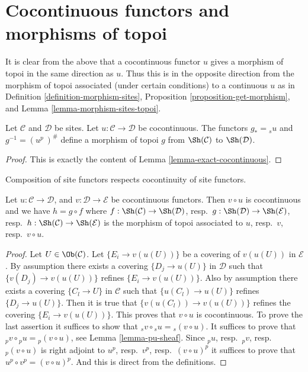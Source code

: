 \section{Cocontinuous functors and morphisms of topoi}
\label{section-cocontinuous-morphism-topoi}

\noindent
It is clear from the above that a cocontinuous functor $u$
gives a morphism of topoi in the same direction as $u$.
Thus this is in the opposite direction from the morphism of topoi
associated (under certain conditions) to a continuous $u$ as in
Definition \ref{definition-morphism-sites},
Proposition \ref{proposition-get-morphism}, and
Lemma \ref{lemma-morphism-sites-topoi}.

\begin{lemma}
\label{lemma-cocontinuous-morphism-topoi}
Let $\mathcal{C}$ and $\mathcal{D}$ be sites.
Let $u : \mathcal{C} \to \mathcal{D}$ be cocontinuous.
The functors $g_* = {}_su$ and $g^{-1} = (u^p\ )^\#$
define a morphism of topoi
$g$ from  $\Sh(\mathcal{C})$ to $\Sh(\mathcal{D})$.
\end{lemma}

\begin{proof}
This is exactly the content of Lemma \ref{lemma-exact-cocontinuous}.
\end{proof}

\begin{lemma}
\label{lemma-composition-cocontinuous}
\begin{slogan}
Composition of site functors respects cocontinuity of site functors.
\end{slogan}
Let $u : \mathcal{C} \to \mathcal{D}$, and $v : \mathcal{D} \to \mathcal{E}$
be cocontinuous functors. Then $v \circ u$ is cocontinuous and we
have $h = g \circ f$
where $f : \Sh(\mathcal{C}) \to \Sh(\mathcal{D})$,
resp.\ $g : \Sh(\mathcal{D}) \to \Sh(\mathcal{E})$,
resp.\ $h : \Sh(\mathcal{C}) \to \Sh(\mathcal{E})$ is the
morphism of topoi associated to $u$, resp.\ $v$, resp.\ $v \circ u$.
\end{lemma}

\begin{proof}
Let $U \in \Ob(\mathcal{C})$.
Let $\{E_i \to v(u(U))\}$ be a covering of $v(u(U))$ in $\mathcal{E}$.
By assumption there exists a covering $\{D_j \to u(U)\}$ in $\mathcal{D}$
such that $\{v(D_j) \to v(u(U))\}$ refines $\{E_i \to v(u(U))\}$. Also
by assumption there exists a covering $\{C_l \to U\}$ in $\mathcal{C}$
such that $\{u(C_l) \to u(U)\}$ refines $\{D_j \to u(U)\}$. Then it is
true that $\{v(u(C_l)) \to v(u(U))\}$ refines the covering
$\{E_i \to v(u(U))\}$. This proves that $v \circ u$ is cocontinuous.
To prove the last assertion it suffices to show that
${}_sv \circ {}_su = {}_s(v \circ u)$. It suffices to prove that
${}_pv \circ {}_pu = {}_p(v \circ u)$, see Lemma \ref{lemma-pu-sheaf}.
Since ${}_pu$, resp.\ ${}_pv$, resp.\ ${}_p(v \circ u)$ is right adjoint to
$u^p$, resp.\ $v^p$, resp.\ $(v \circ u)^p$ it suffices to prove that
$u^p \circ v^p = (v \circ u)^p$. And this is direct from the definitions.
\end{proof}

